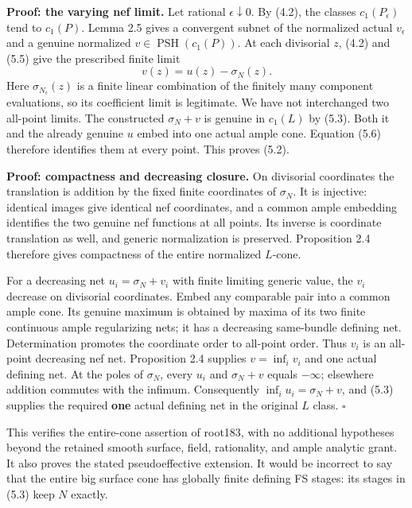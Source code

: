 \documentclass[
  10pt,
]{article}
\begin{document}
\textbf{Proof: the varying nef limit.} Let rational
\(\epsilon\downarrow0\). By (4.2), the classes \(c_1(P_\epsilon)\) tend
to \(c_1(P)\). Lemma 2.5 gives a convergent subnet of the normalized
actual \(v_\epsilon\) and a genuine normalized
\(v\in\operatorname{PSH}(c_1(P))\). At each divisorial \(z\), (4.2) and
(5.5) give the prescribed finite limit \[
 v(z)=u(z)-\sigma_N(z).                                         \tag{5.6}
\] Here \(\sigma_{N_\epsilon}(z)\) is a finite linear combination of the
finitely many component evaluations, so its coefficient limit is
legitimate. We have not interchanged two all-point limits. The
constructed \(\sigma_N+v\) is genuine in \(c_1(L)\) by (5.3). Both it
and the already genuine \(u\) embed into one actual ample cone. Equation
(5.6) therefore identifies them at every point. This proves (5.2).

\textbf{Proof: compactness and decreasing closure.} On divisorial
coordinates the translation is addition by the fixed finite coordinates
of \(\sigma_N\). It is injective: identical images give identical nef
coordinates, and a common ample embedding identifies the two genuine nef
functions at all points. Its inverse is coordinate translation as well,
and generic normalization is preserved. Proposition 2.4 therefore gives
compactness of the entire normalized \(L\)-cone.

For a decreasing net \(u_i=\sigma_N+v_i\) with finite limiting generic
value, the \(v_i\) decrease on divisorial coordinates. Embed any
comparable pair into a common ample cone. Its genuine maximum is
obtained by maxima of its two finite continuous ample regularizing nets;
it has a decreasing same-bundle defining net. Determination promotes the
coordinate order to all-point order. Thus \(v_i\) is an all-point
decreasing nef net. Proposition 2.4 supplies \(v=\inf_i v_i\) and one
actual defining net. At the poles of \(\sigma_N\), every \(u_i\) and
\(\sigma_N+v\) equals \(-\infty\); elsewhere addition commutes with the
infimum. Consequently \(\inf_i u_i=\sigma_N+v\), and (5.3) supplies the
required \textbf{one} actual defining net in the original \(L\) class.
\(\square\)

This verifies the entire-cone assertion of root183, with no additional
hypotheses beyond the retained smooth surface, field, rationality, and
ample analytic grant. It also proves the stated pseudoeffective
extension. It would be incorrect to say that the entire big surface cone
has globally finite defining FS stages: its stages in (5.3) keep \(N\)
exactly.
\end{document}
